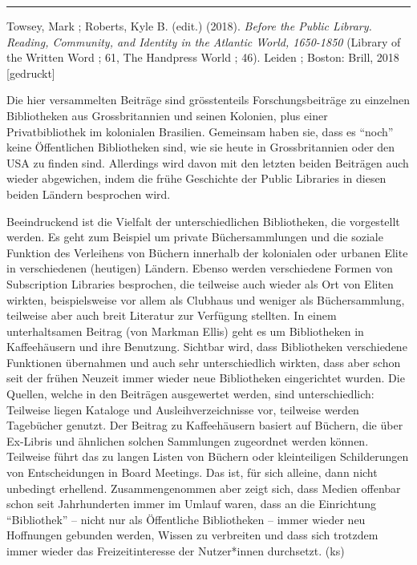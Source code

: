 \documentclass[a4paper,
fontsize=11pt,
oneside,
numbers=noperiodatend,
parskip=half-,
bibliography=totoc,
final
]{scrartcl}
\begin{document}
\begin{center}\rule{0.5\linewidth}{0.5pt}\end{center}

Towsey, Mark ; Roberts, Kyle B. (edit.) (2018). \emph{Before the Public
Library. Reading, Community, and Identity in the Atlantic World,
1650-1850} (Library of the Written Word ; 61, The Handpress World ; 46).
Leiden ; Boston: Brill, 2018 {[}gedruckt{]}

Die hier versammelten Beiträge sind grösstenteils Forschungsbeiträge zu
einzelnen Bibliotheken aus Grossbritannien und seinen Kolonien, plus
einer Privatbibliothek im kolonialen Brasilien. Gemeinsam haben sie,
dass es \enquote{noch} keine Öffentlichen Bibliotheken sind, wie sie
heute in Grossbritannien oder den USA zu finden sind. Allerdings wird
davon mit den letzten beiden Beiträgen auch wieder abgewichen, indem die
frühe Geschichte der Public Libraries in diesen beiden Ländern
besprochen wird.

Beeindruckend ist die Vielfalt der unterschiedlichen Bibliotheken, die
vorgestellt werden. Es geht zum Beispiel um private Büchersammlungen und
die soziale Funktion des Verleihens von Büchern innerhalb der kolonialen
oder urbanen Elite in verschiedenen (heutigen) Ländern. Ebenso werden
verschiedene Formen von Subscription Libraries besprochen, die teilweise
auch wieder als Ort von Eliten wirkten, beispielsweise vor allem als
Clubhaus und weniger als Büchersammlung, teilweise aber auch breit
Literatur zur Verfügung stellten. In einem unterhaltsamen Beitrag (von
Markman Ellis) geht es um Bibliotheken in Kaffeehäusern und ihre
Benutzung. Sichtbar wird, dass Bibliotheken verschiedene Funktionen
übernahmen und auch sehr unterschiedlich wirkten, dass aber schon seit
der frühen Neuzeit immer wieder neue Bibliotheken eingerichtet wurden.
Die Quellen, welche in den Beiträgen ausgewertet werden, sind
unterschiedlich: Teilweise liegen Kataloge und Ausleihverzeichnisse vor,
teilweise werden Tagebücher genutzt. Der Beitrag zu Kaffeehäusern
basiert auf Büchern, die über Ex-Libris und ähnlichen solchen Sammlungen
zugeordnet werden können. Teilweise führt das zu langen Listen von
Büchern oder kleinteiligen Schilderungen von Entscheidungen in Board
Meetings. Das ist, für sich alleine, dann nicht unbedingt erhellend.
Zusammengenommen aber zeigt sich, dass Medien offenbar schon seit
Jahrhunderten immer im Umlauf waren, dass an die Einrichtung
\enquote{Bibliothek} -- nicht nur als Öffentliche Bibliotheken -- immer
wieder neu Hoffnungen gebunden werden, Wissen zu verbreiten und dass
sich trotzdem immer wieder das Freizeitinteresse der Nutzer*innen
durchsetzt. (ks)
\end{document}
